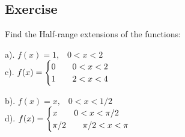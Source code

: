 \documentclass[aima331_lecturenotes_ku.tex]{subfiles}
\begin{document}
\subsection{Exercise}
Find the Half-range extensions of the functions:
\begin{multicols}{2}
  a). $f(x) = 1, \;\;\; 0 < x <2$ \\[1mm]
  c). $\displaystyle f(x) =
  \begin{cases}
    0 \hspace{7mm} 0 < x < 2 \\
    1 \hspace{7mm} 2 < x < 4
  \end{cases}
  $
  \columnbreak

  b). $f(x) = x, \;\;\; 0 < x < 1/2$ \\[1mm]
  d). $\displaystyle f(x) =
  \begin{cases}
    x \hspace{7mm} 0 < x < \pi/2 \\
    \pi /2 \hspace{7mm} \pi /2 < x < \pi
  \end{cases}
  $
\end{multicols}
\end{document}
